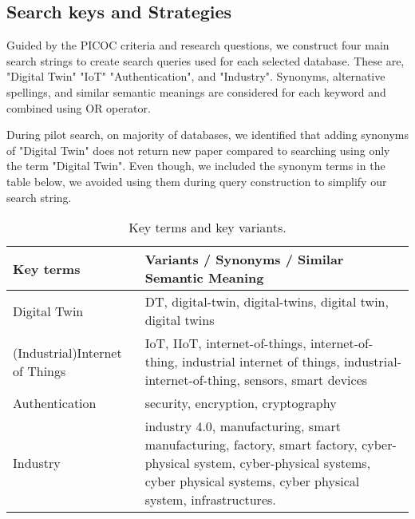 \subsection{Search keys and Strategies}
Guided by the PICOC criteria and  research questions, we construct four main search strings to create search queries used for each selected database. These are, "Digital Twin" "IoT" "Authentication", and "Industry". Synonyms, alternative spellings, and similar semantic meanings are considered for each keyword and combined using OR operator. 

During pilot search, on majority of databases, we identified that adding synonyms of "Digital Twin" does not return new paper compared to searching using only the term "Digital Twin". Even though, we included the synonym terms in the table below, we avoided using them during query construction to simplify our search string. 

\begin{table}[h]
\caption{ Key terms and key variants.}
\begin{NiceTabular}{p{3.2cm}p{11cm}}
\toprule
    \textbf{Key terms} & \textbf{Variants / Synonyms / Similar Semantic Meaning} \\
    \midrule
    Digital Twin & DT, digital-twin, digital-twins, digital twin, digital twins \\ \hline
    (Industrial)Internet of Things & IoT, IIoT, internet-of-things, internet-of-thing, industrial internet of things, industrial-internet-of-thing, sensors, smart devices  \\ \hline
    Authentication & security, encryption, cryptography\\ \hline
    Industry & industry 4.0, manufacturing, smart manufacturing, factory, smart factory, cyber-physical system, cyber-physical systems, cyber physical systems, cyber physical system, infrastructures. \\ 
\bottomrule
\end{NiceTabular}
\end{table}

